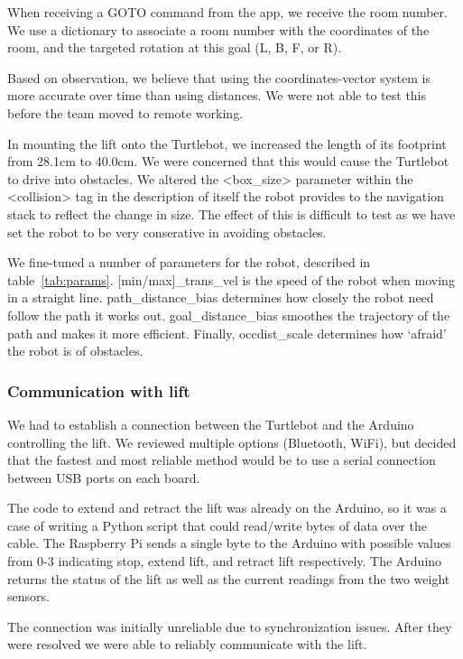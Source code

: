\documentclass{article}
\begin{document}
When receiving a GOTO command from the app, we receive the room number. We use a dictionary to associate a room number with the coordinates of the room, and the targeted rotation at this goal (L, B, F, or R).

Based on observation, we believe that using the coordinates-vector system is more accurate over time than using distances. We were not able to test this before the team moved to remote working. 

In mounting the lift onto the Turtlebot, we increased the length of its footprint from 28.1cm to 40.0cm. We were concerned that this would cause the Turtlebot to drive into obstacles. We altered the <box\_size> parameter within the <collision> tag in the description of itself the robot provides to the navigation stack to reflect the change in size. The effect of this is difficult to test as we have set the robot to be very conserative in avoiding obstacles. 

We fine-tuned a number of parameters for the robot, described in table~\ref{tab:params}. [min/max]\_trans\_vel is the speed of the robot when moving in a straight line. path\_distance\_bias determines how closely the robot need follow the path it works out. goal\_distance\_bias smoothes the trajectory of the path and makes it more efficient. Finally, occdist\_scale determines how `afraid' the robot is of obstacles. 

\subsubsection{Communication with lift}
We had to establish a connection between the Turtlebot and the Arduino controlling the lift. We reviewed multiple options (Bluetooth, WiFi), but decided that the fastest and most reliable method would be to use a serial connection between USB ports on each board.

The code to extend and retract the lift was already on the Arduino, so it was a case of writing a Python script that could read/write bytes of data over the cable. The Raspberry Pi sends a single byte to the Arduino with possible values from 0-3 indicating stop, extend lift, and retract lift respectively. The Arduino returns the status of the lift as well as the current readings from the two weight sensors.

The connection was initially unreliable due to synchronization issues. After they were resolved we were able to reliably communicate with the lift.
\end{document}
